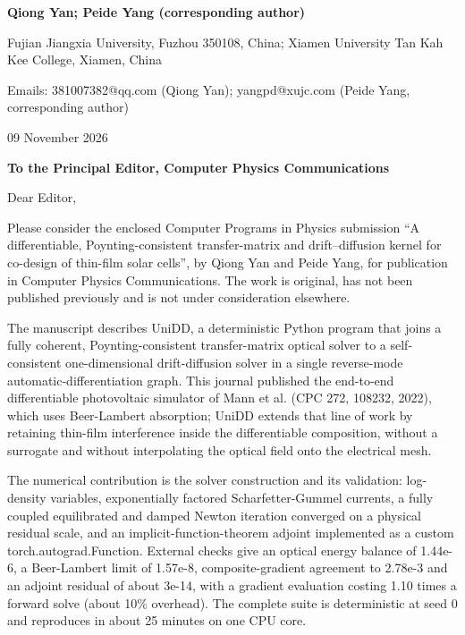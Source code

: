\documentclass[10pt]{article}
\begin{document}
\textbf{Qiong Yan; Peide Yang (corresponding author)}\par
Fujian Jiangxia University, Fuzhou 350108, China; Xiamen University Tan Kah Kee College, Xiamen, China\par
Emails: 381007382@qq.com (Qiong Yan); yangpd@xujc.com (Peide Yang, corresponding author)\par
\vspace{2pt}
09 November 2026\par
\vspace{2pt}
\textbf{To the Principal Editor, Computer Physics Communications}\par
\vspace{2pt}
Dear Editor,\par
\vspace{2pt}
Please consider the enclosed Computer Programs in Physics submission ``A differentiable, Poynting-consistent transfer-matrix and drift--diffusion kernel for co-design of thin-film solar cells'', by Qiong Yan and Peide Yang, for publication in Computer Physics Communications. The work is original, has not been published previously and is not under consideration elsewhere.\par
\vspace{2pt}
The manuscript describes UniDD, a deterministic Python program that joins a fully coherent, Poynting-consistent transfer-matrix optical solver to a self-consistent one-dimensional drift-diffusion solver in a single reverse-mode automatic-differentiation graph. This journal published the end-to-end differentiable photovoltaic simulator of Mann et al. (CPC 272, 108232, 2022), which uses Beer-Lambert absorption; UniDD extends that line of work by retaining thin-film interference inside the differentiable composition, without a surrogate and without interpolating the optical field onto the electrical mesh.\par
\vspace{2pt}
The numerical contribution is the solver construction and its validation: log-density variables, exponentially factored Scharfetter-Gummel currents, a fully coupled equilibrated and damped Newton iteration converged on a physical residual scale, and an implicit-function-theorem adjoint implemented as a custom torch.autograd.Function. External checks give an optical energy balance of 1.44e-6, a Beer-Lambert limit of 1.57e-8, composite-gradient agreement to 2.78e-3 and an adjoint residual of about 3e-14, with a gradient evaluation costing 1.10 times a forward solve (about 10\% overhead). The complete suite is deterministic at seed 0 and reproduces in about 25 minutes on one CPU core.\par
\end{document}
